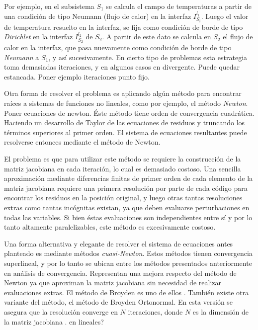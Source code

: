 Por ejemplo, en el subsistema $S_1$ se calcula el campo de temperaturas 
a partir de una condición de tipo Neumann (flujo de calor) en la interfaz $I_{S_i}^{l_1}$.
Luego el valor de temperatura resuelto en la interfaz, se fija como condición de borde de tipo \textit{Dirichlet} en la interfaz $I_{S_2}^{l_2}$ de $S_2$.
A partir de este dato se calcula en $S_2$ el flujo de calor en la interfaz, que pasa nuevamente como condición de borde de tipo \textit{Neumann} a $S_1$,
y así sucesivamente.
En cierto tipo de problemas esta estrategia toma demasiadas iteraciones, y en algunos casos en divergente.
Puede quedar estancada. Poner ejemplo iteraciones punto fijo.

Otra forma de resolver el problema es aplicando algún método para encontrar raíces a sistemas de funciones no lineales,
como por ejemplo, el método \textit{Newton}.
Poner ecuaciones de newton.
Éste método tiene orden de convergencia cuadrática.
Haciendo un desarrollo de Taylor de las ecuaciones de residuos y truncando los términos superiores al primer orden.
El sistema de ecuaciones resultantes puede resolverse entonces mediante el método de Newton. 

El problema es que para utilizar este método se requiere la construcción de la matriz jacobiana en cada iteración, lo cual es demasiado costoso.
Una sencilla aproximación mediante diferencias finitas de primer orden de cada elemento de la matriz jacobiana 
requiere una primera resolución por parte de cada código para encontrar los residuos en la posición original, y luego otras tantas resoluciones extras
como tantas incógnitas existan, ya que deben evaluarse perturbaciones en todas las variables.
Si bien éstas evaluaciones son independientes entre sí y por lo tanto altamente paralelizables, este método es excesivamente costoso.

Una forma alternativa y elegante de resolver el sistema de ecuaciones antes planteado es mediante métodos \textit{cuasi-Newton}.
Estos métodos tienen convergencia superlineal, y por lo tanto se ubican entre los métodos presentados anteriormente en análisis de convergencia. 
Representan una mejora respecto del método de Newton ya que aproximan la matriz jacobiana sin necesidad de realizar evaluaciones extras. 
El método de Broyden es uno de ellos \cite{broyden}.
También existe otra variante del método, el método de Broyden Ortonormal.
En esta versión se asegura que la resolución converge en $N$ iteraciones, donde $N$ es la dimensión de la matriz jacobiana \cite{broyden-on}.
en lineales?

